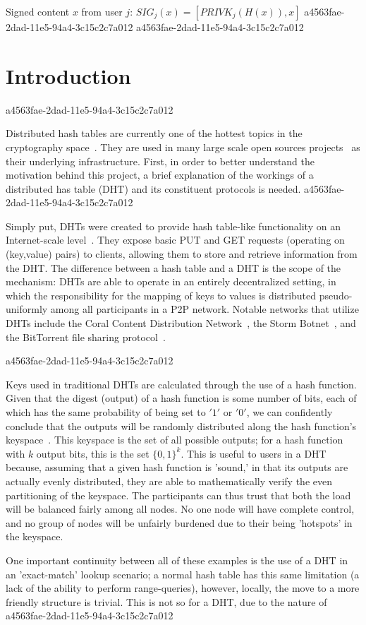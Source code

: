 \documentclass[12pt]{article}
\begin{document}
Signed content $x$ from user $j$: $SIG_j(x) = \left[ PRIVK_j( H(x) ), x \right]$
a4563fae-2dad-11e5-94a4-3c15c2c7a012
a4563fae-2dad-11e5-94a4-3c15c2c7a012\section{Introduction}
a4563fae-2dad-11e5-94a4-3c15c2c7a012\par Distributed hash tables are currently one of the hottest topics in the cryptography space~\cite{Stoica:2001dj,Rowstron:2001ea,Ratnasamy:2001wn}. They are used in many large scale open sources projects~\cite{Freitas:2013tb,Xu:2010vs,Perfitt:2010fh} as their underlying infrastructure. First, in order to better understand the motivation behind this project, a brief explanation of the workings of a distributed has table (DHT) and its constituent protocols is needed.
a4563fae-2dad-11e5-94a4-3c15c2c7a012
\par Simply put, DHTs were created to provide hash table-like functionality on an Internet-scale level~\cite{Ratnasamy:2001wn}. They expose basic PUT and GET requests (operating on (key,value) pairs) to clients, allowing them to store and retrieve information from the DHT. The difference between a hash table and a DHT is the scope of the mechanism: DHTs are able to operate in an entirely decentralized setting, in which the responsibility for the mapping of keys to values is distributed pseudo-uniformly among all participants in a P2P network. Notable networks that utilize DHTs include the Coral Content Distribution Network~\cite{Freedman:2004vb}, the Storm Botnet~\cite{Holz:2008uk}, and the BitTorrent file sharing protocol~\cite{Cohen:y1_8mBnw}.

a4563fae-2dad-11e5-94a4-3c15c2c7a012\par Keys used in traditional DHTs are calculated through the use of a hash function. Given that the digest (output) of a hash function is some number of bits, each of which has the same probability of being set to $'1'$ or $'0'$, we can confidently conclude that the outputs will be randomly distributed along the hash function's keyspace~. This keyspace is the set of all possible outputs; for a hash function with $k$ output bits, this is the set $\{0,1\}^k$. This is useful to users in a DHT because, assuming that a given hash function is 'sound,' in that its outputs are actually evenly distributed, they are able to mathematically verify the even partitioning of the keyspace. The participants can thus trust that both the load will be balanced fairly among all nodes. No one node will have complete control, and no group of nodes will be unfairly burdened due to their being 'hotspots' in the keyspace.~

\par One important continuity between all of these examples is the use of a DHT in an 'exact-match' lookup scenario; a normal hash table has this same limitation (a lack of the ability to perform range-queries), however, locally, the move to a more friendly structure is trivial. This is not so for a DHT, due to the nature of
\printbibliography
a4563fae-2dad-11e5-94a4-3c15c2c7a012
\end{document}
